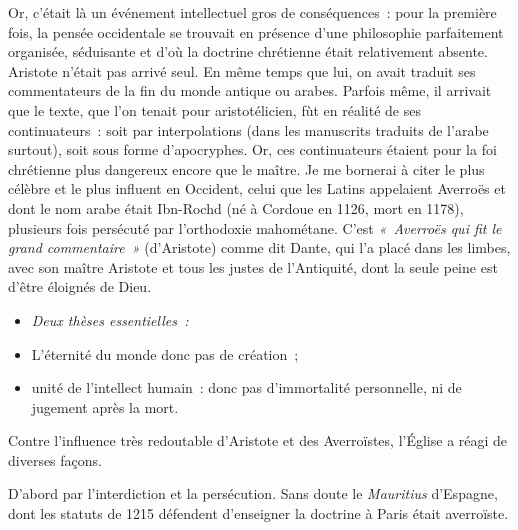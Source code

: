 \documentclass[french,twoside]{book} %
\newlength{\listmod}
\newcommand{\listhead}[1]{\hspace{-1\listmod}\emph{#1}}
\newcommand\foreign[1]{\emph{#1}}
\begin{document}
Or, c’était là un événement intellectuel gros de conséquences : pour la première fois, la pensée occidentale se trouvait en présence d’une philosophie parfaitement organisée, séduisante et d’où la doctrine chrétienne était relativement absente. Aristote n’était pas arrivé seul. En même temps que lui, on avait traduit ses commentateurs de la fin du monde antique ou arabes. Parfois même, il arrivait que le texte, que l’on tenait pour aristotélicien, fùt en réalité de ses continuateurs : soit par interpolations (dans les manuscrits traduits de l’arabe surtout), soit sous forme d’apocryphes. Or, ces continuateurs étaient pour la foi chrétienne plus dangereux encore que le maître. Je me bornerai à citer le plus célèbre et le plus influent en Occident, celui que les Latins appelaient Averroës et dont le nom arabe était Ibn-Rochd (né à Cordoue en 1126, mort en 1178), plusieurs fois persécuté par l’orthodoxie mahométane. C’est \emph{« Averroës qui fit le grand commentaire »} (d’Aristote) comme dit Dante, qui l’a placé dans les limbes, avec son maître Aristote et tous les justes de l’Antiquité, dont la seule peine est d’être éloignés de Dieu.\par

\begin{itemize}[itemsep=0pt,]
\item[]\listhead{Deux thèses essentielles :}
\item L’éternité du monde donc pas de création ;
\item unité de l’intellect humain : donc pas d’immortalité personnelle, ni de jugement après la mort.
\end{itemize}

\noindent Contre l’influence très redoutable d’Aristote et des Averroïstes, l’Église a réagi de diverses façons.\par
D’abord par l’interdiction et la persécution. Sans doute le \foreign{Mauritius} d’Espagne, dont les statuts de 1215 défendent d’enseigner la doctrine à Paris était averroïste.\par
\end{document}
